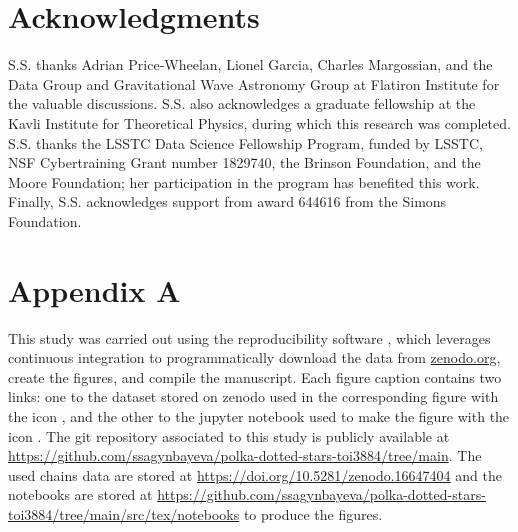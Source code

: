 \documentclass[twocolumn]{aastex631}
\begin{document}
\section*{Acknowledgments}
S.S. thanks Adrian Price-Wheelan, Lionel Garcia, Charles Margossian, and the Data Group
and Gravitational Wave Astronomy Group at Flatiron Institute for
the valuable discussions. S.S. also acknowledges a graduate fellowship at the
Kavli Institute for Theoretical Physics, during which this research was
completed. S.S. thanks the LSSTC Data Science Fellowship Program, funded by
LSSTC, NSF Cybertraining Grant number 1829740, the Brinson Foundation, and the
Moore Foundation; her participation in the program has benefited this work. Finally, S.S. 
acknowledges support from award 644616 from the Simons Foundation.

\section*{Appendix A}
This study was carried out using the reproducibility software
\href{https://github.com/showyourwork/showyourwork}{\showyourwork}
\citep{Luger2021}, which leverages continuous integration to
programmatically download the data from
\href{https://zenodo.org/}{zenodo.org}, create the figures, and
compile the manuscript. Each figure caption contains two links: one
to the dataset stored on zenodo used in the corresponding figure with the icon \faDatabase,
and the other to the jupyter notebook used to make the figure with the icon \faGithub. The git
repository associated to this study is publicly available at
\url{https://github.com/ssagynbayeva/polka-dotted-stars-toi3884/tree/main}. 
The used chains data
are stored at \url{https://doi.org/10.5281/zenodo.16647404} and the notebooks are stored at 
\url{https://github.com/ssagynbayeva/polka-dotted-stars-toi3884/tree/main/src/tex/notebooks} to produce the figures.


\end{document}
